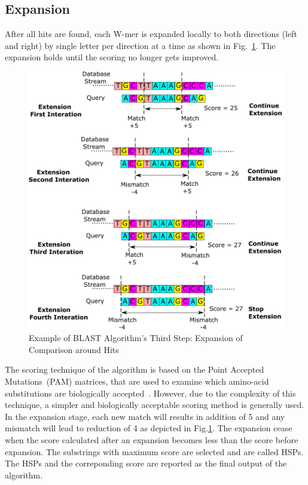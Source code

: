 \subsection{Expansion}
After all hits are found, each W-mer is expanded locally to both directions (left and right) by single letter per direction at a time as shown in Fig.~\ref{fig:step3}. 
The expansion holds until the scoring no longer gets improved.
\begin{figure}[b!]
\centering
\includegraphics[width=\columnwidth]{Figures/Algorithm3.pdf}
\caption{Example of BLAST Algorithm's Third Step: Expansion of Comparison around Hits} \label{fig:step3}
\end{figure}
The scoring technique of the algorithm is based on the Point Accepted Mutations~(PAM) matrices, that are used to examine which amino-acid substitutions are biologically accepted~\cite{sotiriades2007design}. 
However, due to the complexity of this technique, a simpler and biologically acceptable scoring method is generally used. 
In the expansion stage, each new match will results in addition of 5 and any mismatch will lead to reduction of 4 as depicted in Fig.\ref{fig:step3}.
The expansion cease when the score calculated after an expansion becomes less than the score before expansion.
The substrings with maximum score are selected and are called HSPs.
The HSPs and the correponding score are reported as the final output of the algorithm.

